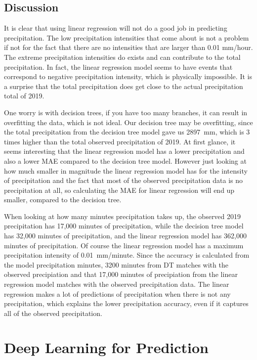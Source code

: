 \documentclass[11pt]{report}
\begin{document}
\subsection{Discussion}
It is clear that using linear regression will not do a good job in
predicting precipitation. The low precipitation intensities that come
about is not a problem if not for the fact that there are no intensities
that are larger than 0.01 mm/hour. The extreme precipitation intensities
do exists and can contribute to the total precipitation. In fact, the
linear regression model seems to have events that correspond to negative
precipitation intensity, which is physically impossible. It is a surprise that
the total precipitation does get close to the actual precipitation total of 2019. 

One worry is with decision trees, if you have too many branches, it can
result in overfitting the data, which is not ideal. Our decision tree may
be overfitting, since the total precipitation from the decision tree model gave us 2897~mm, which is 3 times higher than the total observed precipitation of 2019. At first glance, it seems interesting that the linear regression model has a lower precipitation and also a lower MAE compared to the decision tree model. However just looking at how much smaller in magnitude the linear regression model has for the intensity of precipitation and the fact that most of the observed precipitation data is no precipitation at all, so calculating the MAE for linear regression will end up smaller, compared to the decision tree. 

When looking at how many minutes precipitation takes up, the observed 2019 precipitation has 17,000 minutes of precipitation, while the decision tree model has 32,000 minutes of precipitation, and the linear regression model has 362,000 minutes of precipitation. Of course the linear regression model has a maximum precipitation intensity of 0.01~mm/minute. Since the accuracy is calculated from the model precipitation minutes, 3200 minutes from DT matches with the observed precipiation and that 17,000 minutes of precipiation from the linear regression model matches with the observed precipitation data. The linear regression makes a lot of predictions of precipitation when there is not any precipitation, which explains the lower precipitation accuracy, even if it captures all of the observed precipitation. 

\clearpage

\section{Deep Learning for Prediction}\label{sec:neural}
\end{document}
